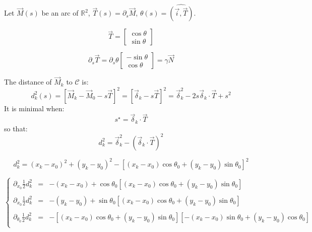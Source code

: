 \documentclass[aps,12pt]{revtex4}
\begin{document}
Let  $\vec{M}(s)$ be an arc of $\mathbb{R}^2$,  $\vec{T}(s) = \partial_s \vec{M}$, $\theta(s) = \widehat{(\vec{i},\vec{T})}$.

\begin{equation}
	\vec{T} = 
	\begin{bmatrix}
	\cos \theta\\
	\sin \theta
	\end{bmatrix}
\end{equation}

\begin{equation}
	\partial_s \vec{T} = \partial_s \theta 
	\begin{bmatrix}
	-\sin\theta\\
	\cos \theta
	\end{bmatrix}
 = \gamma \vec{N}
\end{equation}

The distance of $\vec{M}_k$ to $\mathcal{C}$ is: 
\begin{equation}
	d^2_k(s) = \left[ \vec{M}_k - \vec{M}_0 - s \vec{T}\right]^2 = \left[ \vec{\delta}_k - s \vec{T}\right]^2
	=  \vec{\delta}_k^2 - 2 s  \vec{\delta}_k \cdot \vec{T} + s^2
\end{equation}
It is minimal when:
\begin{equation}
	s^\star = \vec{\delta}_k \cdot \vec{T}
\end{equation}
so that:
\begin{equation}
	d^2_k = \vec{\delta}_k^2 - \left(\vec{\delta}_k \cdot \vec{T} \right)^2  
\end{equation}

\begin{equation}
 	d^2_k =  (x_k-x_0)^2 + (y_k -y_0)^2 - \left[ (x_k-x_0)\cos\theta_0 + (y_k-y_0)\sin\theta_0\right]^2
\end{equation}

\begin{equation}
\left\lbrace
\begin{array}{rcl}
\partial_{x_0} \frac{1}{2} d^2_k & = & -(x_k-x_0) + \cos\theta_0 \left[ (x_k-x_0)\cos\theta_0 + (y_k-y_0)\sin\theta_0\right]\\
\\
\partial_{x_0} \frac{1}{2} d^2_k & = & -(y_k-y_0) + \sin\theta_0 \left[ (x_k-x_0)\cos\theta_0 + (y_k-y_0)\sin\theta_0\right]\\
\\
\partial_{\theta_0} \frac{1}{2} d^2_k & = & -\left[ (x_k-x_0)\cos\theta_0 + (y_k-y_0)\sin\theta_0\right]\left[ -(x_k-x_0)\sin\theta_0 + (y_k-y_0)\cos\theta_0\right]\\
\end{array}
\right.
\end{equation}
\end{document}
